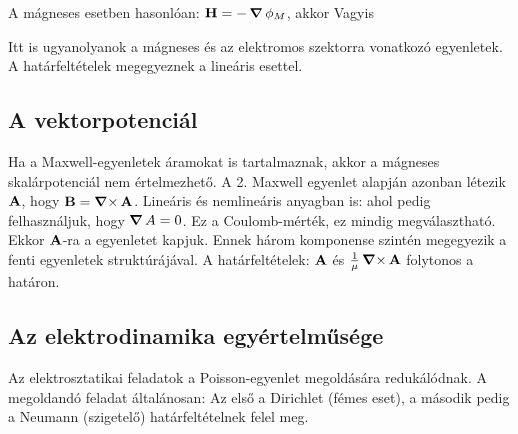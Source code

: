     A mágneses esetben hasonlóan: $\mathbf{H}=-\mathop{\boldsymbol{\nabla}}\nolimits{\phi_M}$, akkor
    Vagyis 
    
    Itt is ugyanolyanok a mágneses és az elektromos szektorra vonatkozó egyenletek. A határfeltételek megegyeznek a lineáris esettel.
    
  \subsection{A vektorpotenciál}
   
   Ha a Maxwell-egyenletek áramokat is tartalmaznak, akkor a mágneses skalárpotenciál nem értelmezhető. A 2. Maxwell egyenlet alapján azonban létezik $\mathbf{A}$, hogy $\mathbf{B}=\mathop{\boldsymbol{\nabla}\times}\nolimits{\mathbf{A}}$. Lineáris és nemlineáris anyagban is:
   ahol pedig felhasználjuk, hogy $\mathop{\boldsymbol{\nabla}}\nolimits{A}=0$. Ez a Coulomb-mérték, ez mindig megválasztható. Ekkor $\mathbf{A}$-ra a
   egyenletet kapjuk. Ennek három komponense szintén megegyezik a fenti egyenletek struktúrájával. A határfeltételek: $\mathbf{A}$ és $\frac{1}{\mu}\mathop{\boldsymbol{\nabla}\times}\nolimits{\mathbf{A}}$ folytonos a határon. 
   
   
    
    
  \subsection{Az elektrodinamika egyértelműsége}
   
   Az elektrosztatikai feladatok a Poisson-egyenlet megoldására redukálódnak. A megoldandó feladat általánosan:
   Az első a Dirichlet (fémes eset), a második pedig a Neumann (szigetelő) határfeltételnek felel meg. 
   
